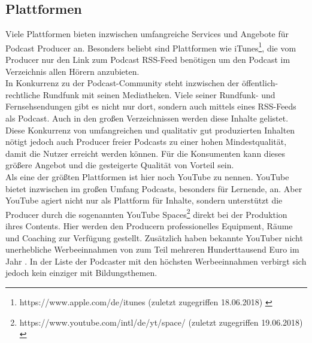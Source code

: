 \documentclass[11pt,a4paper]{scrreprt}
\begin{document}
\subsection{Plattformen}
Viele Plattformen bieten inzwischen umfangreiche Services und Angebote für Podcast Producer an. Besonders beliebt sind Plattformen wie iTunes\footnote{https://www.apple.com/de/itunes (zuletzt zugegriffen 18.06.2018) \cite{Apple2001}}, die vom Producer nur den Link zum Podcast \ac{RSS}-Feed benötigen um den Podcast im Verzeichnis allen Hörern anzubieten. \\
In Konkurrenz zu der Podcast-Community steht inzwischen der öffentlich-rechtliche Rundfunk mit seinen Mediatheken. Viele seiner Rundfunk- und Fernsehsendungen gibt es nicht nur dort, sondern auch mittels eines \ac{RSS}-Feeds als Podcast. Auch in den großen Verzeichnissen werden diese Inhalte gelistet. Diese Konkurrenz von umfangreichen und qualitativ gut produzierten Inhalten nötigt jedoch auch Producer freier Podcasts zu einer hohen Mindestqualität, damit die Nutzer erreicht werden können. Für die Konsumenten kann dieses größere Angebot und die gesteigerte Qualität von Vorteil sein.\\
Als eine der größten Plattformen ist hier noch YouTube zu nennen. YouTube bietet inzwischen im großen Umfang Podcasts, besonders für Lernende, an. Aber YouTube agiert nicht nur als Plattform für Inhalte, sondern unterstützt die Producer durch die sogenannten YouTube Spaces\footnote{https://www.youtube.com/intl/de/yt/space/ (zuletzt zugegriffen 19.06.2018) \cite{YouTubeLLC2005}} direkt bei der Produktion ihres Contents. Hier werden den Producern professionelles Equipment, Räume und Coaching zur Verfügung gestellt. Zusätzlich haben bekannte YouTuber nicht unerhebliche Werbeeinnahmen von zum Teil mehreren Hunderttausend Euro im Jahr  \cite{Statista2017}. In der Liste der Podcaster mit den höchsten Werbeeinnahmen verbirgt sich jedoch kein einziger mit Bildungsthemen. 
\end{document}
